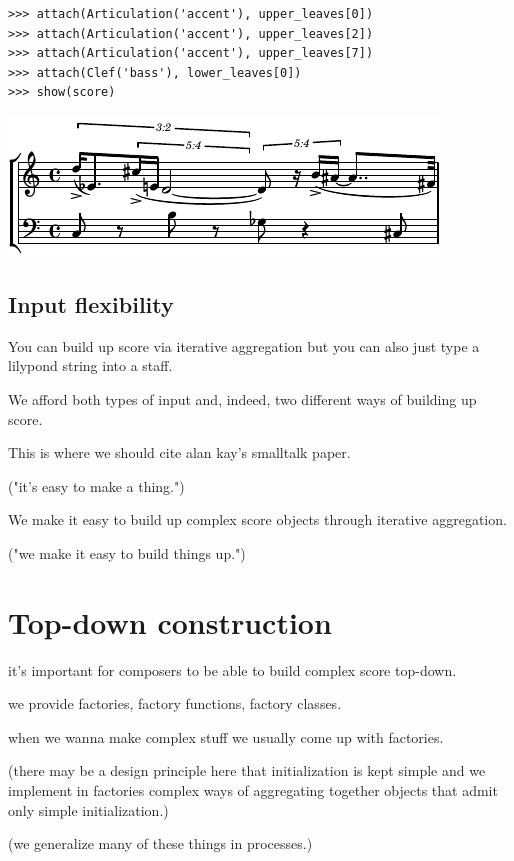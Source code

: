 \documentclass{article}
\begin{document}
\begin{lstlisting}
>>> attach(Articulation('accent'), upper_leaves[0])
>>> attach(Articulation('accent'), upper_leaves[2])
>>> attach(Articulation('accent'), upper_leaves[7])
>>> attach(Clef('bass'), lower_leaves[0])
>>> show(score)
\end{lstlisting}

\noindent\includegraphics[scale=1.0]{images/abjad-2.pdf}


\subsection{Input flexibility}


You can build up score via iterative aggregation but you can also just type a
lilypond string into a staff.

We afford both types of input and, indeed, two different ways of building up
score.

This is where we should cite alan kay's smalltalk paper.

("it's easy to make a thing.")

We make it easy to build up complex score objects through iterative
aggregation.

("we make it easy to build things up.")

\section{Top-down construction}

it's important for composers to be able to build complex
score top-down.

we provide factories, factory functions, factory classes.

when we wanna make complex stuff we usually come up with factories.

(there may be a design principle here that initialization is kept simple and we
implement in factories complex ways of aggregating together objects that admit
only simple initialization.)

(we generalize many of these things in processes.)
\end{document}
